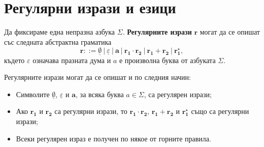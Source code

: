 \section{Регулярни изрази и езици}

Да фиксираме една непразна азбука $\Sigma$.
{\bf Регулярните изрази} $\mathbf{r}$ могат да се опишат със следната абстрактна граматика
\[\mathbf{r} ::= \underline{\emptyset}\ |\ \underline{\varepsilon}\ |\ \mathbf{a}\ |\ \mathbf{ r_1 \cdot r_2}\ |\ \mathbf{r_1 + r_2}\ |\ \mathbf{r^\star_1},\]
където $\varepsilon$ означава празната дума и $a$ е произволна буква от азбуката $\Sigma$.

Регулярните изрази могат да се опишат и по следния начин:
\begin{itemize}
\item 
  Символите $\underline{\emptyset}$, $\underline{\varepsilon}$ и $\mathbf{a}$, за всяка буква $a \in \Sigma$, са регулярен изрази;
\item
  Ако $\mathbf{r_1}$ и $\mathbf{r_2}$ са регулярни изрази, то $\mathbf{r_1 \cdot r_2}$, $\mathbf{r_1 + r_2}$ и $\mathbf{r^\star_1}$
  също са регулярни изрази;
\item
  Всеки регулярен израз е получен по някое от горните правила.
\end{itemize}

